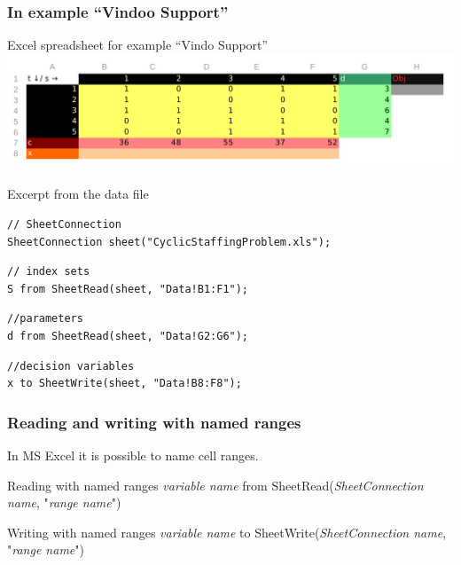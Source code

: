 \begin{frame}[fragile]
 \frametitle{In example ``Vindoo Support''}
 \begin{block}{Excel spreadsheet for example ``Vindo Support''}
  \centering
  \includegraphics[width=.9\linewidth]{Bilder/CyclicStaffingData}
 \end{block}
 \begin{block}{Excerpt from the data file}
\begin{lstlisting}[language=opldata,numbers=none,basicstyle=\ttfamily\scriptsize]
// SheetConnection
SheetConnection sheet("CyclicStaffingProblem.xls");
\end{lstlisting}\vspace{-2\baselineskip}
\begin{lstlisting}[language=opldata,numbers=none,basicstyle=\ttfamily\scriptsize]
// index sets
S from SheetRead(sheet, "Data!B1:F1");
\end{lstlisting}\vspace{-2\baselineskip}
\begin{lstlisting}[language=opldata,numbers=none,basicstyle=\ttfamily\scriptsize]
//parameters
d from SheetRead(sheet, "Data!G2:G6");
\end{lstlisting}\vspace{-2\baselineskip}
\begin{lstlisting}[language=opldata,numbers=none,basicstyle=\ttfamily\scriptsize]
//decision variables
x to SheetWrite(sheet, "Data!B8:F8");
\end{lstlisting}
 \end{block}
\end{frame}

\begin{frame}
 \frametitle{Reading and writing with named ranges}
 In MS Excel it is possible to name cell ranges.
 \begin{block}{Reading with named ranges}
  \ttfamily
  \textsf{\slshape variable name} from SheetRead(\textsf{\slshape SheetConnection name}, "\textsf{\slshape range name}")
 \end{block}
 \begin{block}{Writing with named ranges}
  \ttfamily
  \textsf{\slshape variable name} to SheetWrite(\textsf{\slshape SheetConnection name}, "\textsf{\slshape range name}")
 \end{block}
\end{frame}

